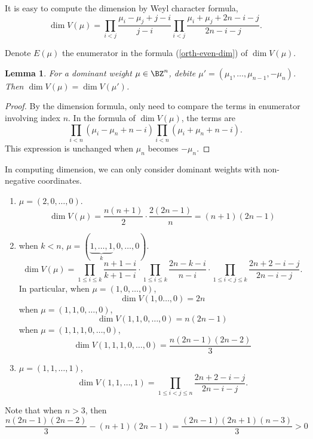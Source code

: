 \documentclass[a4paper]{amsart}
\theoremstyle{plain}
\newtheorem{lem}[thm]{Lemma}
\theoremstyle{remark} \newtheorem{remark}[thm]{Remark}
\theoremstyle{remark} \newtheorem{exercise}{Exercise}
\theoremstyle{remark} \newtheorem{example}{Example}
\numberwithin{equation}{section}
\begin{document}
It is easy to compute the dimension by Weyl character formula,
\begin{equation}\label{orth-even-dim}
    \dim V(\mu)=\prod_{i<j}\frac{\mu_i-\mu_j+j-i}{j-i}\prod_{i<j}\frac{\mu_i+\mu_j+2n-i-j}{2n-i-j}.
\end{equation}

Denote $E(\mu)$ the enumerator in the formula (\ref{orth-even-dim}) of $\dim V(\mu)$.

\begin{lem}
    For a dominant weight $\mu\in\BZ^n$, debite $\mu'=(\mu_1,\ldots,\mu_{n-1},-\mu_n)$. Then $\dim V(\mu)=\dim V(\mu')$.
\end{lem}
\begin{proof}
    By the dimension formula, only need to compare the terms in enumerator involving index $n$. In the formula of $\dim V(\mu)$, the terms are
    \[\prod_{i<n}(\mu_i-\mu_n+n-i)\prod_{i<n}(\mu_i+\mu_n+n-i).\]
    This expression is unchanged when $\mu_n$ becomes $-\mu_n$.
\end{proof}

In computing dimension, we can only consider dominant weights with non-negative coordinates.

\iffalse

\begin{enumerate}
    \item $\mu=(2,0,\ldots,0)$. 
    \begin{equation}
        \dim V(\mu)=\dfrac{n(n+1)}{2}\cdot \dfrac{2(2n-1)}{n}=(n+1)(2n-1)
    \end{equation}
    \item when $k<n$, $\mu=(\underbrace{1,\ldots,1}_k,0,\ldots,0)$.
    \begin{equation}
        \dim V(\mu)=\prod_{1\leqslant i\leqslant k}\dfrac{n+1-i}{k+1-i}\cdot \prod_{1\leqslant i\leqslant k}\dfrac{2n-k-i}{n-i}\cdot \prod_{1\leqslant i<j\leqslant k}\dfrac{2n+2-i-j}{2n-i-j}.
    \end{equation}
    In particular, when $\mu=(1,0,\dots,0)$, 
    \begin{equation}
        \dim V(1,0\dots,0)=2n
    \end{equation}
    when $\mu=(1,1,0,\dots,0)$,
    \begin{equation}
        \dim V(1,1,0,\dots,0)=n(2n-1)
    \end{equation}
    when $\mu=(1,1,1,0,\dots,0)$,
    \begin{equation}
        \dim V(1,1,1,0,\dots,0)=\dfrac{n(2n-1)(2n-2)}{3}
    \end{equation}
    \item $\mu=(1,1,\dots,1)$, 
    \[
    \dim V(1,1,\dots,1)=\prod_{1\leqslant i<j\leqslant n}\dfrac{2n+2-i-j}{2n-i-j}.
    \]
\end{enumerate}
Note that when $n>3$, then 
\[
\dfrac{n(2n-1)(2n-2)}{3}-(n+1)(2n-1)=\dfrac{(2n-1)(2n+1)(n-3)}{3}>0
\]
\end{document}
